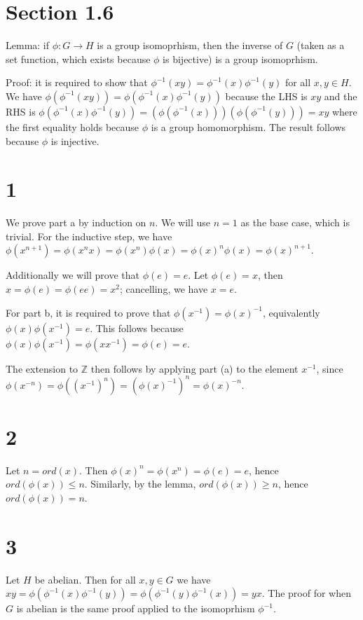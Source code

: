 \documentclass{article}
\def\Z{\mathbb{Z}}
\def\inv{{-1}}
\begin{document}
\section*{Section 1.6}

Lemma: if $\phi: G \to H$ is a group isomoprhism, then the inverse of $G$ (taken as a set function, which exists because $\phi$ is bijective) is a group isomoprhism.

Proof: it is required to show that $\phi^\inv(xy) = \phi^\inv(x)\phi^\inv(y)$ for all $x, y \in H$. We have $\phi(\phi^\inv(xy)) = \phi(\phi^\inv(x)\phi^\inv(y))$ because the LHS is $xy$ and the RHS is $\phi(\phi^\inv(x)\phi^\inv(y)) = (\phi(\phi^\inv(x))) (\phi(\phi^\inv(y))) = xy$ where the first equality holds because $\phi$ is a group homomorphism. The result follows because $\phi$ is injective.

\section*{1}

We prove part a by induction on $n$. We will use $n=1$ as the base case, which is trivial. For the inductive step, we have $\phi(x^{n+1}) = \phi(x^n x) = \phi(x^n) \phi(x) = \phi(x)^n \phi(x) = \phi(x)^{n+1}$.

Additionally we will prove that $\phi(e) = e$. Let $\phi(e) = x$, then $x = \phi(e) = \phi(ee) = x^2$; cancelling, we have $x = e$.

For part b, it is required to prove that $\phi(x^\inv) = \phi(x)^\inv$, equivalently $\phi(x) \phi(x^\inv) = e$. This follows because $\phi(x) \phi(x^\inv) = \phi(x x^\inv) = \phi(e) = e$.

The extension to $\Z$ then follows by applying part (a) to the element $x^\inv$, since $\phi(x^{-n}) = \phi((x^\inv)^n) = (\phi(x)^\inv)^n = \phi(x)^{-n}$.

\section*{2}

Let $n = ord(x)$. Then $\phi(x)^n = \phi(x^n) = \phi(e) = e$, hence $ord(\phi(x)) \le n$. Similarly, by the lemma, $ord(\phi(x)) \ge n$, hence $ord(\phi(x)) = n$.

\section*{3}

Let $H$ be abelian. Then for all $x, y \in G$ we have $xy = \phi(\phi^\inv(x) \phi^\inv(y)) = \phi(\phi^\inv(y) \phi^\inv(x)) = yx$. The proof for when $G$ is abelian is the same proof applied to the isomoprhism $\phi^\inv$.
\end{document}
